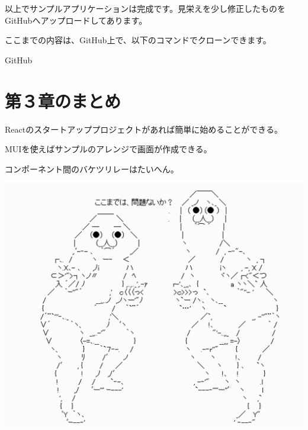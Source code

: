 以上でサンプルアプリケーションは完成です。見栄えを少し修正したものをGitHubへアップロードしてあります。

\begin{starternote}[]{}

ここまでの内容は、GitHub上で、以下のコマンドでクローンできます。

\def\startercodeblockfontsize{}
\begin{starterterminal}[]{GitHub}\end{starterterminal}
\end{starternote}

\section{第３章のまとめ}
\keeplastskip{
  \label{sec:3-5}
  \label{sec03-sammary}
  \par\nobreak
}

\begin{starteritemize}
\item Reactのスタートアッププロジェクトがあれば簡単に始めることができる。
\item MUIを使えばサンプルのアレンジで画面が作成できる。
\item コンポーネント間のバケツリレーはたいへん。
\end{starteritemize}

\begin{reviewimage}[H]%
\includegraphics[width=0.7\maxwidth]{./images/03-todo-with-react/understand.png}%
\label{image:03-todo-with-react:understand}
\end{reviewimage}
